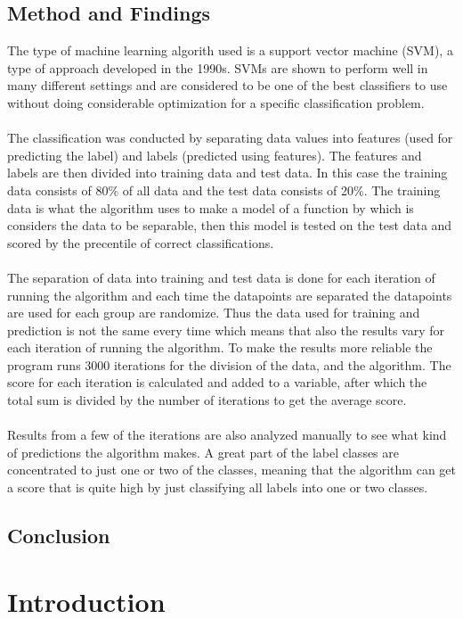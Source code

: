 \documentclass[11pt]{article}
\begin{document}
\subsection*{Method and Findings}
The type of machine learning algorith used is a support vector machine (SVM), a type of approach developed in the 1990s. SVMs are shown to perform well in many different settings and are considered to be one of the best classifiers to use without doing considerable optimization for a specific classification problem.\\
\\
The classification was conducted by separating data values into features (used for predicting the label) and labels (predicted using features). The features and labels are then divided into training data and test data. In this case the training data consists of 80\% of all data and the test data consists of 20\%. The training data is what the algorithm uses to make a model of a function by which is considers the data to be separable, then this model is tested on the test data and scored by the precentile of correct  classifications.\\
\\
The separation of data into training and test data is done for each iteration of running the algorithm and each time the datapoints are separated the datapoints are used for each group are randomize. Thus the data used for training and prediction is not the same every time which means that also the results vary for each iteration of running the algorithm. To make the results more reliable the program runs 3000 iterations for the division of the data, and the algorithm. The score for each iteration is calculated and added to a variable, after which the total sum is divided by the number of iterations to get the average score.\\
\\
Results from a few of the iterations are also analyzed manually to see what kind of predictions the algorithm makes. A great part of the label classes are concentrated to just one or two of the classes, meaning that the algorithm can get a score that is quite high by just classifying all labels into one or two classes.

\subsection*{Conclusion}

\newpage
\tableofcontents
\newpage
\section{Introduction}
\end{document}
